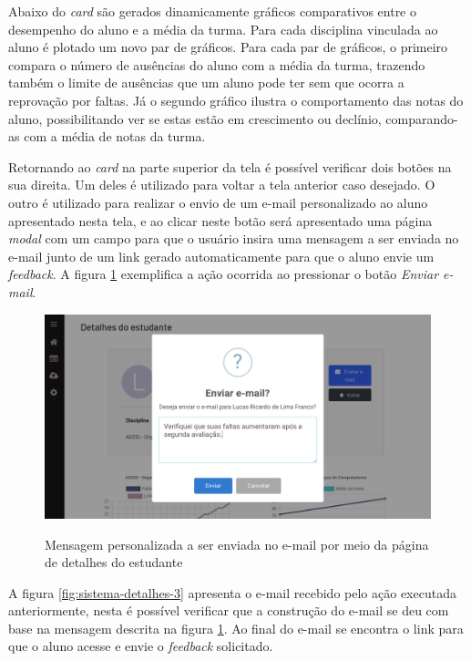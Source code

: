 Abaixo do \textit{card} são gerados dinamicamente gráficos comparativos entre o desempenho do aluno e a média da turma. 
Para cada disciplina vinculada ao aluno é plotado um novo par de gráficos.
Para cada par de gráficos, o primeiro compara o número de ausências do aluno com a média da turma, trazendo também o limite de ausências que um aluno pode ter sem que ocorra a reprovação por faltas.
Já o segundo gráfico ilustra o comportamento das notas do aluno, possibilitando ver se estas estão em crescimento ou declínio, comparando-as com a média de notas da turma.

Retornando ao \textit{card} na parte superior da tela é possível verificar dois botões na sua direita. 
Um deles é utilizado para voltar a tela anterior caso desejado.
O outro é utilizado para realizar o envio de um e-mail personalizado ao aluno apresentado nesta tela, e ao clicar neste botão será apresentado uma página \textit{modal} com um campo para que o usuário insira uma mensagem a ser enviada no e-mail junto de um link gerado automaticamente para que o aluno envie um \textit{feedback}. 
A figura \ref{fig:sistema-detalhes-2} exemplifica a ação ocorrida ao pressionar o botão \textit{Enviar e-mail}.

\begin{figure}[!htb]
    \centering
    \caption{Mensagem personalizada a ser enviada no e-mail por meio da página de detalhes do estudante}
    \includegraphics[width=1\textwidth]{./dados/figuras/sistema/sistema-detalhes-2}
    \label{fig:sistema-detalhes-2}
\end{figure}

A figura \ref{fig:sistema-detalhes-3} apresenta o e-mail recebido pelo ação executada anteriormente, nesta é possível verificar que a construção do e-mail se deu com base na mensagem descrita na figura \ref{fig:sistema-detalhes-2}.
Ao final do e-mail se encontra o link para que o aluno acesse e envie o \textit{feedback} solicitado.

